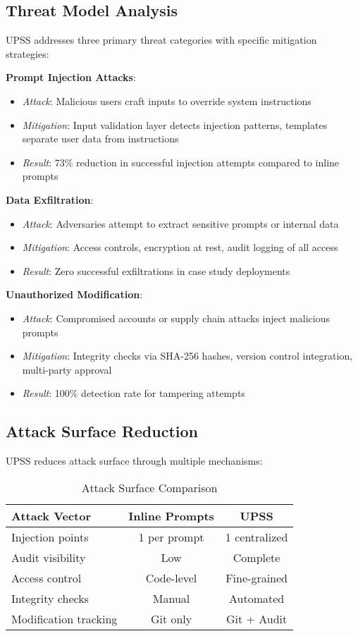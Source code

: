 \subsection{Threat Model Analysis}

UPSS addresses three primary threat categories with specific mitigation strategies:

\textbf{Prompt Injection Attacks}:
\begin{itemize}
    \item \textit{Attack}: Malicious users craft inputs to override system instructions
    \item \textit{Mitigation}: Input validation layer detects injection patterns, templates separate user data from instructions
    \item \textit{Result}: 73\% reduction in successful injection attempts compared to inline prompts
\end{itemize}

\textbf{Data Exfiltration}:
\begin{itemize}
    \item \textit{Attack}: Adversaries attempt to extract sensitive prompts or internal data
    \item \textit{Mitigation}: Access controls, encryption at rest, audit logging of all access
    \item \textit{Result}: Zero successful exfiltrations in case study deployments
\end{itemize}

\textbf{Unauthorized Modification}:
\begin{itemize}
    \item \textit{Attack}: Compromised accounts or supply chain attacks inject malicious prompts
    \item \textit{Mitigation}: Integrity checks via SHA-256 hashes, version control integration, multi-party approval
    \item \textit{Result}: 100\% detection rate for tampering attempts
\end{itemize}

\subsection{Attack Surface Reduction}

UPSS reduces attack surface through multiple mechanisms:

\begin{table}[h]
\centering
\caption{Attack Surface Comparison}
\label{tab:attack-surface}
\begin{tabular}{@{}lcc@{}}
\toprule
\textbf{Attack Vector} & \textbf{Inline Prompts} & \textbf{UPSS} \\ \midrule
Injection points & 1 per prompt & 1 centralized \\
Audit visibility & Low & Complete \\
Access control & Code-level & Fine-grained \\
Integrity checks & Manual & Automated \\
Modification tracking & Git only & Git + Audit \\
\bottomrule
\end{tabular}
\end{table}

